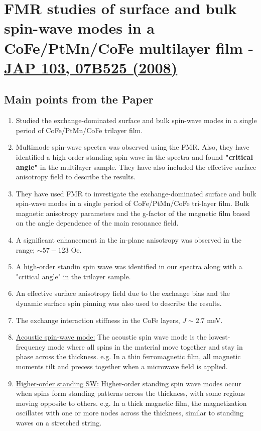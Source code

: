 \section{FMR studies of surface and bulk spin-wave modes in a CoFe/PtMn/CoFe multilayer film - \href{http://dx.doi.org/10.1063/1.2839337}{JAP 103, 07B525 (2008)}}
\subsection*{Main points from the Paper}
\begin{enumerate}
    \item Studied the exchange-dominated surface and bulk spin-wave modes in a single period of CoFe/PtMn/CoFe trilayer film.
    \item Multimode spin-wave spectra was observed using the FMR. Also, they have identified a high-order standing spin wave in the spectra and found \textbf{"critical angle"} in the multilayer sample. They have also included the effective surface anisotropy field to describe the results.
    \item They have used FMR to investigate the exchange-dominated surface and bulk spin-wave modes in a single period of CoFe/PtMn/CoFe tri-layer film. Bulk magnetic anisotropy parameters and the g-factor of the magnetic film based on the angle dependence of the main resonance field.
    \item A significant enhancement in the in-plane anisotropy was observed in the range; $\sim57-123$ Oe.
    \item A high-order standin spin wave was identified in our spectra along with a "critical angle" in the trilayer sample. 
    \item An effective surface anisotropy field due to the exchange bias and the dynamic surface spin pinning was also used to describe the results.
    \item The exchange interaction stiffness in the CoFe layers, $J\sim 2.7$ meV.
    \item \underline{Acoustic spin-wave mode:} The acoustic spin wave mode is the lowest-frequency mode where all spins in the material move together and stay in phase across the thickness. e.g. In a thin ferromagnetic film, all magnetic moments tilt and precess together when a microwave field is applied.
    \item \underline{Higher-order standing SW:} Higher-order standing spin wave modes occur when spins form standing patterns across the thickness, with some regions moving opposite to others. e.g. In a thick magnetic film, the magnetization oscillates with one or more nodes across the thickness, similar to standing waves on a stretched string.

\end{enumerate}
